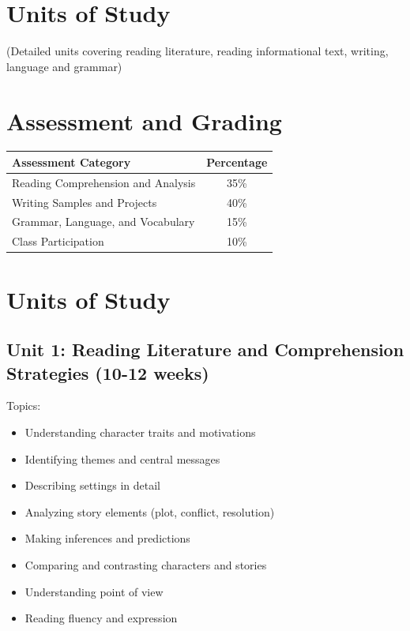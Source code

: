 \documentclass[11pt,letterpaper]{report}
\begin{document}
\section{Units of Study}

(Detailed units covering reading literature, reading informational text, writing, language and grammar)

\section{Assessment and Grading}

\begin{center}
\begin{tabular}{|l|c|}
\hline
\textbf{Assessment Category} & \textbf{Percentage} \\
\hline
Reading Comprehension and Analysis & 35\% \\
\hline
Writing Samples and Projects & 40\% \\
\hline
Grammar, Language, and Vocabulary & 15\% \\
\hline
Class Participation & 10\% \\
\hline
\end{tabular}
\end{center}

\section{Units of Study}

\subsection{Unit 1: Reading Literature and Comprehension Strategies (10-12 weeks)}

Topics:
\begin{itemize}
\item Understanding character traits and motivations
\item Identifying themes and central messages
\item Describing settings in detail
\item Analyzing story elements (plot, conflict, resolution)
\item Making inferences and predictions
\item Comparing and contrasting characters and stories
\item Understanding point of view
\item Reading fluency and expression
\end{itemize}
\end{document}
